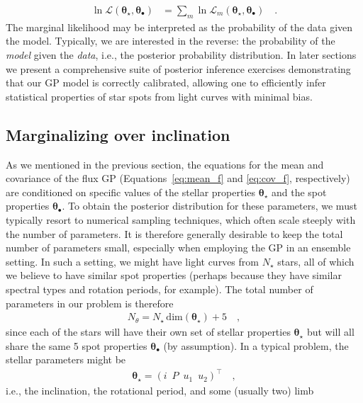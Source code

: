 \documentclass[modern]{aastex62}
\begin{document}
%
\begin{align}
    \ln \mathcal{L}\left(\pmb{\theta}_\star, \pmb{\theta}_\bullet\right)
     & =
    \sum_{m} \ln \mathcal{L}_m\left(\pmb{\theta}_\star, \pmb{\theta}_\bullet\right)
    \quad.
\end{align}
%
The marginal likelihood may be interpreted as the probability of the data
given the model. Typically, we are interested in the reverse: the probability
of the \emph{model} given the \emph{data}, i.e., the posterior probability
distribution. In later sections we present a comprehensive suite of
posterior inference exercises demonstrating that our GP model is correctly
calibrated, allowing one to efficiently infer statistical properties of star spots
from light curves with minimal bias.


\subsection{Marginalizing over inclination}
\label{sec:inclination}
%
As we mentioned in the previous section,
the equations for the mean and covariance of the flux GP
(Equations~\ref{eq:mean_f} and \ref{eq:cov_f}, respectively) are conditioned
on specific values of the stellar properties $\pmb{\theta}_\star$ and the
spot properties $\pmb{\theta}_\bullet$. To obtain the posterior distribution
for these parameters, we must typically resort to numerical sampling techniques,
which often scale steeply with the number of parameters. It is therefore generally
desirable to keep the total number of parameters small, especially when
employing the GP in an ensemble setting.
In such a setting, we might have light curves from $N_\star$ stars, all of which
we believe to have similar spot properties (perhaps because they have
similar spectral types and rotation periods, for example).
The total number of parameters in our problem is therefore
%
\begin{align}
    N_\theta = N_\star \, \mathrm{dim}(\pmb{\theta}_\star) + 5
    \quad,
\end{align}
%
since each of the stars will have their own set of stellar properties
$\pmb{\theta}_\star$ but will all share the same 5 spot properties
$\pmb{\theta}_\bullet$ (by assumption).
In a typical problem, the stellar parameters might be
%
\begin{align}
    \pmb{\theta}_\star =
    \left(
    i \,\,\,
    P \,\,\,
    u_1 \,\,\,
    u_2
    \right)^\top
    \quad,
\end{align}
%
i.e., the inclination, the rotational period, and some (usually two) limb
\end{document}
